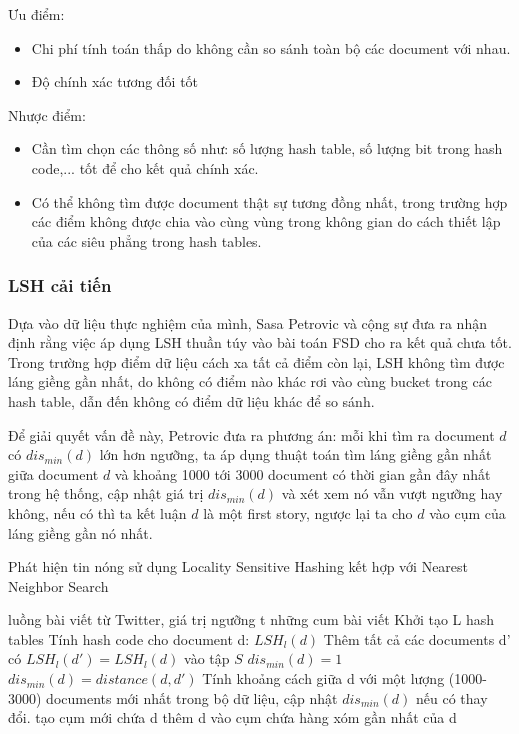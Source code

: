 	Ưu điểm:
	\begin{itemize}
		\item Chi phí tính toán thấp do không cần so sánh toàn bộ các document với nhau.
		\item Độ chính xác tương đối tốt
	\end{itemize}

	Nhược điểm:
	\begin{itemize}
		\item Cần tìm chọn các thông số như: số lượng hash table, số lượng bit trong hash code,... tốt để cho kết quả chính xác.
		\item Có thể không tìm được document thật sự tương đồng nhất, trong trường hợp các điểm không được chia vào cùng vùng trong không gian do cách thiết lập của các siêu phẳng trong hash tables.
	\end{itemize}
	
	\subsubsection{LSH cải tiến}
	Dựa vào dữ liệu thực nghiệm của mình, Sasa Petrovic và cộng sự \cite{Petrovic:LSH} đưa ra nhận định rằng việc áp dụng LSH thuần túy vào bài toán FSD cho ra kết quả chưa tốt. Trong trường hợp điểm dữ liệu cách xa tất cả điểm còn lại, LSH không tìm được láng giềng gần nhất, do không có điểm nào khác rơi vào cùng bucket trong các hash table, dẫn đến không có điểm dữ liệu khác để so sánh. 
	
	Để giải quyết vấn đề này, Petrovic đưa ra phương án: mỗi khi tìm ra document $d$ có $dis_{min}(d)$ lớn hơn ngưỡng, ta áp dụng thuật toán tìm láng giềng gần nhất giữa document $d$ và khoảng 1000 tới 3000 document có thời gian gần đây nhất trong hệ thống, cập nhật giá trị $dis_{min}(d)$ và xét xem nó vẫn vượt ngưỡng hay không, nếu có thì ta kết luận $d$ là một first story, ngược lại ta cho $d$ vào cụm của láng giềng gần nó nhất.
	
	\begin{algorithm}[H]
		\caption{Phát hiện tin nóng sử dụng Locality Sensitive Hashing kết hợp với Nearest Neighbor Search}
		\begin{algorithmic}[1]
			\REQUIRE luồng bài viết từ Twitter, giá trị ngưỡng t
			\ENSURE những cum bài viết
			\State Khởi tạo L hash tables
					\State Tính hash code cho document d: $LSH_l(d)$
					\State Thêm tất cả các documents d' có $LSH_l(d') = LSH_l(d)$ vào tập $S$
				\ENDFOR
				\State $dis_{min}(d) = 1$
					\unboldmath
					\State $dis_{min}(d) = distance(d,d')$
					\ENDIF
				\ENDFOR
					\State Tính khoảng cách giữa d với một lượng (1000-3000) documents mới nhất trong bộ dữ liệu, cập nhật $dis_{min}(d)$ nếu có thay đổi.
				\ENDIF
					\STATE tạo cụm mới chứa d
				\ELSE
					\STATE thêm d vào cụm chứa hàng xóm gần nhất của d
				\ENDIF
			\ENDFOR		
			
		\end{algorithmic}
	\end{algorithm}

